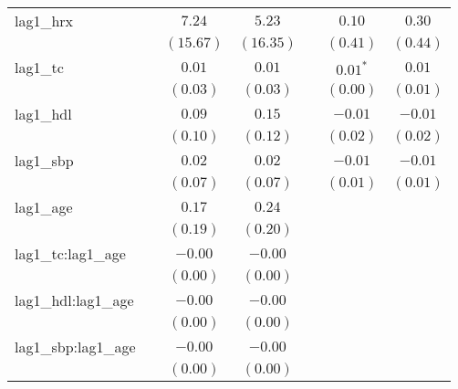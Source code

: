 \begin{tabular}{l c c c c c c}
lag1\_hrx                         &              & $7.24$     & $5.23$     &                & $0.10$         & $0.30$         \\
                                  &              & $(15.67)$  & $(16.35)$  &                & $(0.41)$       & $(0.44)$       \\
lag1\_tc                          &              & $0.01$     & $0.01$     &                & $0.01^{*}$     & $0.01$         \\
                                  &              & $(0.03)$   & $(0.03)$   &                & $(0.00)$       & $(0.01)$       \\
lag1\_hdl                         &              & $0.09$     & $0.15$     &                & $-0.01$        & $-0.01$        \\
                                  &              & $(0.10)$   & $(0.12)$   &                & $(0.02)$       & $(0.02)$       \\
lag1\_sbp                         &              & $0.02$     & $0.02$     &                & $-0.01$        & $-0.01$        \\
                                  &              & $(0.07)$   & $(0.07)$   &                & $(0.01)$       & $(0.01)$       \\
lag1\_age                         &              & $0.17$     & $0.24$     &                &                &                \\
                                  &              & $(0.19)$   & $(0.20)$   &                &                &                \\
lag1\_tc:lag1\_age                &              & $-0.00$    & $-0.00$    &                &                &                \\
                                  &              & $(0.00)$   & $(0.00)$   &                &                &                \\
lag1\_hdl:lag1\_age               &              & $-0.00$    & $-0.00$    &                &                &                \\
                                  &              & $(0.00)$   & $(0.00)$   &                &                &                \\
lag1\_sbp:lag1\_age               &              & $-0.00$    & $-0.00$    &                &                &                \\
                                  &              & $(0.00)$   & $(0.00)$   &                &                &                \\

\end{tabular}
